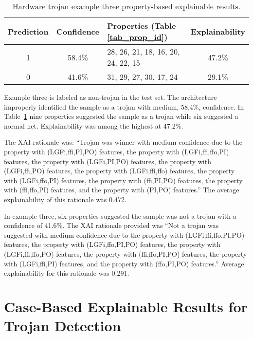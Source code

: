 \begin{table}[H]
    \renewcommand{\arraystretch}{1.3}
    \caption{Hardware trojan example three property-based explainable results.}
    \begin{center}
    \begin{tabular}{|c|c|p{}|c|}
        \hline
         Prediction &  Confidence &  Properties (Table \ref{tab_prop_id}) &  Explainability \\
        \hline
        \hline
        1 & 58.4\% & 28, 26, 21, 18, 16, 20, 24, 22, 15 & 47.2\% \\
        \hline
        0 & 41.6\% & 31, 29, 27, 30, 17, 24 & 29.1\% \\
        \hline
    \end{tabular}
    \end{center}
    \label{tab_prop_exp_ex_3}
\end{table}

Example three is labeled as non-trojan in the test set.  The architecture
improperly identified the sample as a trojan with medium, 58.4\%, confidence. In
Table~\ref{tab_prop_exp_ex_3} nine properties suggested the sample as a trojan while
six suggested a normal net.  Explainability was among the highest at 47.2\%.

The XAI rationale
was: ``Trojan was winner with medium confidence due to the property with
(LGFi,ffi,PI,PO) features, the property with (LGFi,ffi,ffo,PI) features, the
property with (LGFi,PI,PO) features, the property with (LGFi,ffi,PO) features,
the property with (LGFi,ffi,ffo) features, the property with (LGFi,ffo,PI)
features, the property with (ffi,PI,PO) features, the property with (ffi,ffo,PI)
features, and the property with (PI,PO) features.'' The average explainability
of this rationale was 0.472.

In example three, six properties suggested the sample was not a trojan with a
confidence of 41.6\%. The XAI rationale provided was ``Not a trojan was
suggested with medium confidence due to the property with (LGFi,ffi,ffo,PI,PO)
features, the property with (LGFi,ffo,PI,PO) features, the property with
(LGFi,ffi,ffo,PO) features, the property with (ffi,ffo,PI,PO) features, the
property with (LGFi,ffi,PI) features, and the property with (ffo,PI,PO)
features.''  Average explainability for this rationale was 0.291.

\section{Case-Based Explainable Results for Trojan Detection} \label{case_exp_results}

